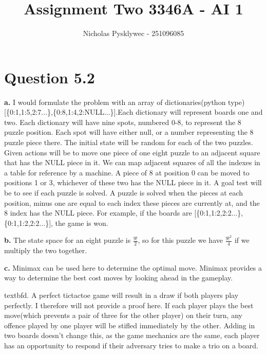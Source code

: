 \documentclass[12pt]{amsart}
\title{Assignment Two 3346A - AI 1}
\author{Nicholas Pysklywec - 251096085}
\begin{document}
\maketitle
\tableofcontents

\section*{Question 5.2 }
\textbf{a.} I would formulate the problem with an array of dictionaries(python type) [\{0:1,1:5,2:7...\},\{0:8,1:4,2:NULL...\}].Each dictionary will represent boards one and two. Each dictionary will have nine spots, numbered 0-8, to represent the 8 puzzle position. Each spot will have either null, or a number representing the 8 puzzle piece there. The initial state will be random for each of the two puzzles. Given actions will be to move one piece of one eight puzzle to an adjacent square that has the NULL piece in it. We can map adjacent squares of all the indexes in a table for reference by a machine. A  piece of 8 at position 0 can be moved to positions 1 or 3, whichever of these two has the NULL piece in it. A goal test will be to see if each puzzle is solved. A puzzle is solved when the pieces at each position, minus one are equal to each index these pieces are currently at, and the 8 index has the NULL piece. For example, if the boards are [\{0:1,1:2,2:2...\},\{0:1,1:2,2:2...\}], the game is won.

   \hfill \break
   
   \textbf{b.}
   The state space for an eight puzzle is $\frac{9!}{2}$, so for this puzzle we have $\frac{9!^{2}}{4}$ if we multiply the two together.
      \hfill \break
      
         \textbf{c.}
         Minimax can be used here to determine the optimal move. Minimax provides a way to determine the best cost moves by looking ahead in the gameplay.
         
          \hfill \break
          
         textbf{d.} A perfect tictactoe game will result in a draw if both players play perfectly. I therefore will not provide a proof here. If each player plays the best move(which prevents a pair of three for the other player) on their turn, any offence played by one player will be stifled immediately by the other. Adding in two boards doesn't change this, as the game mechanics are the same, each player has an opportunity to respond if their adversary tries to make a trio on a board.
   
\end{document}
